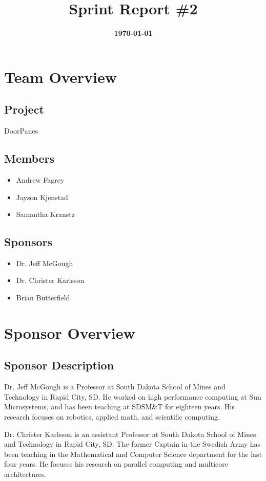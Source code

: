 \documentclass{article}
\title{\normalfont\Large\bfseries\color{TitleColor}Sprint Report \#2}
\date{\normalfont\bfseries\color{TitleColor}\today}
\begin{document}
\maketitle

\section*{Team Overview}
\subsection*{Project}
{DoorPanes}

\subsection*{Members}
\begin{itemize}
	\item Andrew Fagrey
	\item Jayson Kjenstad
	\item Samantha Kranstz
\end{itemize}

\subsection*{Sponsors}
\begin{itemize}
	\item Dr. Jeff McGough
	\item Dr. Christer Karlsson
	\item Brian Butterfield
\end{itemize}

\section*{Sponsor Overview}
\subsection*{Sponsor Description}
Dr. Jeff McGough is a Professor at South Dakota School of Mines and Technology in Rapid City, SD. He worked on high performance computing at Sun Microsystems, and has been teaching at SDSM\&T for eighteen years. His research focuses on robotics, applied math, and scientific computing.\newline 

Dr. Christer Karlsson is an assistant Professor at South Dakota School of Mines and Technology in Rapid City, SD. The former Captain in the Swedish Army has been teaching in the Mathematical and Computer Science department for the last four years. He focuses his research on parallel computing and multicore architectures. \newline
\end{document}

